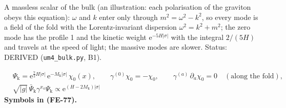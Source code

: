 \documentclass[
  10pt,
]{article}
\begin{document}
A massless scalar of the bulk (an illustration: each polarisation of the
graviton obeys this equation): \(\omega\) and \(k\) enter only through
\(m^2 = \omega^2 - k^2\), so every mode is a field of the fold with the
Lorentz-invariant dispersion \(\omega^2 = k^2 + m^2\); the zero mode has
the profile 1 and the kinetic weight
\(\mathrm{e}^{-5H\lvert\sigma\rvert}\) with the integral \(2/(5H)\) and
travels at the speed of light; the massive modes are slower. Status:
DERIVED (\texttt{um4\_bulk.py}, B1).

\[
\begin{aligned}
&\Psi_{\mathrm{k}} = \mathrm{e}^{\frac72H\lvert\sigma\rvert}\,\mathrm{e}^{-M_{\mathrm{k}}\lvert\sigma\rvert}\,\chi_0(x),\qquad
\gamma^{(0)}\chi_0 = -\chi_0,\qquad \gamma^{(a)}\,\partial_a\chi_0 = 0\quad(\text{along the fold}),\\
&\sqrt{\lvert g\rvert}\,\bar\Psi_{\mathrm{k}}\gamma^{x_4}\Psi_{\mathrm{k}} \propto \mathrm{e}^{(H - 2M_{\mathrm{k}})\lvert\sigma\rvert}
\end{aligned} \tag{FE-77}
\] \textbf{Symbols in (FE-77).}
\end{document}
